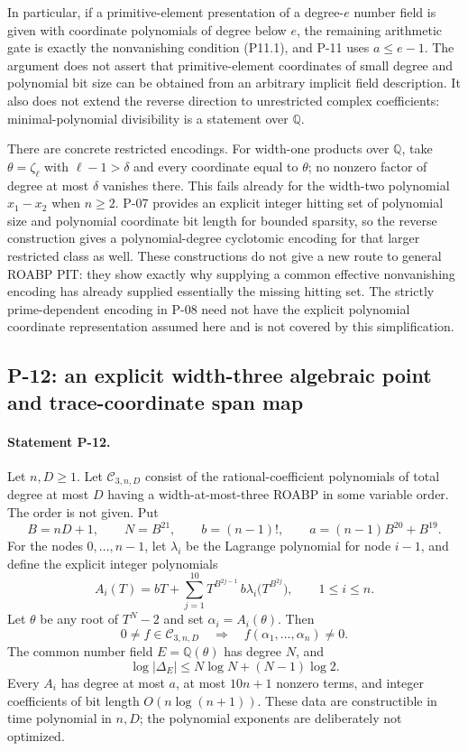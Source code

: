 In particular, if a primitive-element presentation of a degree-$e$ number field is given with coordinate polynomials of degree below $e$, the remaining arithmetic gate is exactly the nonvanishing condition (P11.1), and P-11 uses $a\le e-1$. The argument does not assert that primitive-element coordinates of small degree and polynomial bit size can be obtained from an arbitrary implicit field description. It also does not extend the reverse direction to unrestricted complex coefficients: minimal-polynomial divisibility is a statement over $\mathbb Q$.

There are concrete restricted encodings. For width-one products over $\mathbb Q$, take $\theta=\zeta_\ell$ with $\ell-1>\delta$ and every coordinate equal to $\theta$; no nonzero factor of degree at most $\delta$ vanishes there. This fails already for the width-two polynomial $x_1-x_2$ when $n\ge2$. P-07 provides an explicit integer hitting set of polynomial size and polynomial coordinate bit length for bounded sparsity, so the reverse construction gives a polynomial-degree cyclotomic encoding for that larger restricted class as well. These constructions do not give a new route to general ROABP PIT: they show exactly why supplying a common effective nonvanishing encoding has already supplied essentially the missing hitting set. The strictly prime-dependent encoding in P-08 need not have the explicit polynomial coordinate representation assumed here and is not covered by this simplification.

\subsection{P-12: an explicit width-three algebraic point and trace-coordinate span map}
\paragraph{Statement P-12.}
Let $n,D\ge1$.  Let $\mathcal C_{3,n,D}$ consist of the rational-coefficient polynomials of total degree at most $D$ having a width-at-most-three ROABP in some variable order.  The order is not given.  Put
\[
 B=nD+1,\qquad N=B^{21},\qquad b=(n-1)!,\qquad
 a=(n-1)B^{20}+B^{19}.
\]
For the nodes $0,\ldots,n-1$, let $\lambda_i$ be the Lagrange polynomial for node $i-1$, and define the explicit integer polynomials
\[
 A_i(T)=bT+
    \sum_{j=1}^{10}T^{B^{2j-1}}\,
       b\lambda_i\bigl(T^{B^{2j}}\bigr),
       \qquad 1\le i\le n.
 \tag{P12.1}
\]
Let $\theta$ be any root of $T^N-2$ and set $\alpha_i=A_i(\theta)$.  Then
\[
 0\ne f\in\mathcal C_{3,n,D}\quad\Longrightarrow\quad
 f(\alpha_1,\ldots,\alpha_n)\ne0.
 \tag{P12.2}
\]
The common number field $E=\mathbb Q(\theta)$ has degree $N$, and
\[
 \log|\Delta_E|\le N\log N+(N-1)\log2.
 \tag{P12.3}
\]
Every $A_i$ has degree at most $a$, at most $10n+1$ nonzero terms, and integer coefficients of bit length $O(n\log(n+1))$.  These data are constructible in time polynomial in $n,D$; the polynomial exponents are deliberately not optimized.

